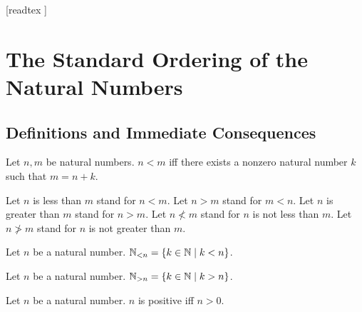 \documentclass[10pt]{article}
\begin{document}
  \begin{imports}
    \begin{forthel}
      [readtex ]
    \end{forthel}
  \end{imports}


  \section*{The Standard Ordering of the Natural Numbers}

  \subsection*{Definitions and Immediate Consequences}

  \begin{forthel}
    \begin{definition}
      Let $n, m$ be natural numbers.
      $n < m$ iff there exists a nonzero natural number $k$ such that $m = n + k$.
    \end{definition}

    Let $n$ is less than $m$ stand for $n < m$.
    Let $n > m$ stand for $m < n$.
    Let $n$ is greater than $m$ stand for $n > m$.
    Let $n \nless m$ stand for $n$ is not less than $m$.
    Let $n \ngtr m$ stand for $n$ is not greater than $m$.
  \end{forthel}

  \begin{forthel}
    \begin{definition}
      Let $n$ be a natural number.
      $\mathbb{N}_{< n} = \{ k \in \mathbb{N} \mid k < n \}$.
    \end{definition}
  \end{forthel}

  \begin{forthel}
    \begin{definition}
      Let $n$ be a natural number.
      $\mathbb{N}_{> n} = \{ k \in \mathbb{N} \mid k > n \}$.
    \end{definition}
  \end{forthel}

  \begin{forthel}
    \begin{definition}
      Let $n$ be a natural number.
      $n$ is positive iff $n > 0$.
    \end{definition}
  \end{forthel}
\end{document}
